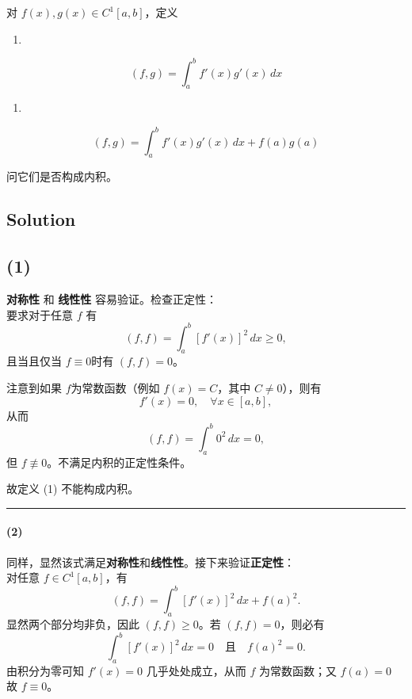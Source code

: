 \documentclass[11pt]{article}
\providecommand{\tightlist}{%
      \setlength{\itemsep}{0pt}\setlength{\parskip}{0pt}}
\begin{document}
对 \(f(x),g(x) \in C^1[a,b]\)，定义

\begin{enumerate}
\def\labelenumi{(\arabic{enumi})}
\tightlist
\item
\end{enumerate}

\[
(f,g) = \int_a^bf'(x)g'(x)\,dx
\]

\begin{enumerate}
\def\labelenumi{(\arabic{enumi})}
\setcounter{enumi}{1}
\tightlist
\item
\end{enumerate}

\[
(f,g) = \int_a^bf'(x)g'(x)\,dx + f(a)g(a)
\]

问它们是否构成内积。

    \subsection{Solution}\label{solution}

\subsection{(1)}\label{section}

\textbf{对称性} 和 \textbf{线性性} 容易验证。检查正定性：\\
要求对于任意 \(f\) 有 \[
(f,f)=\int_a^b \left[f'(x)\right]^2\,dx\ge0,
\] 且当且仅当 \(f\equiv0\)时有 \((f,f)=0\)。

注意到如果 \(f\)为常数函数（例如 \(f(x)=C\)，其中 \(C\neq0\)），则有\\
\[
f'(x)=0,\quad \forall x\in[a,b],
\] 从而 \[
(f,f)=\int_a^b 0^2\,dx=0,
\] 但 \(f\not\equiv0\)。不满足内积的正定性条件。

故定义 (1) 不能构成内积。

\begin{center}\rule{0.5\linewidth}{0.5pt}\end{center}

\paragraph{(2)}\label{section-1}

同样，显然该式满足\textbf{对称性}和\textbf{线性性}。接下来验证\textbf{正定性}：\\
对任意 \(f\in C^1[a,b]\)，有 \[
(f,f)=\int_a^b \left[f'(x)\right]^2\,dx + f(a)^2.
\] 显然两个部分均非负，因此 \((f,f)\ge0\)。若 \((f,f)=0\)，则必有 \[
\int_a^b \left[f'(x)\right]^2\,dx = 0 \quad \text{且} \quad f(a)^2 = 0.
\] 由积分为零可知 \(f'(x)=0\) 几乎处处成立，从而 \(f\) 为常数函数；又
\(f(a)=0\) 故 \(f\equiv0\)。
\end{document}
